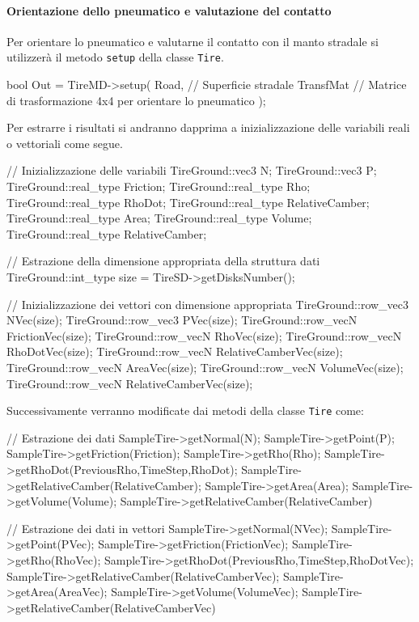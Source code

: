 \paragraph{Orientazione dello pneumatico e valutazione del contatto}
Per orientare lo pneumatico e valutarne il contatto con il manto stradale si utilizzerà il metodo \texttt{setup} della classe \texttt{Tire}.
\begin{pseudoc}
bool Out = TireMD->setup(
	Road,     // Superficie stradale
	TransfMat // Matrice di trasformazione 4x4 per orientare lo pneumatico
	);
\end{pseudoc}
Per estrarre i risultati si andranno dapprima a inizializzazione delle variabili reali o vettoriali come segue.
\begin{pseudoc}
	// Inizializzazione delle variabili
	TireGround::vec3 N;
	TireGround::vec3 P;
	TireGround::real_type Friction;
	TireGround::real_type Rho;
	TireGround::real_type RhoDot;
	TireGround::real_type RelativeCamber;
	TireGround::real_type Area;
	TireGround::real_type Volume;
	TireGround::real_type RelativeCamber;
	
	// Estrazione della dimensione appropriata della struttura dati
	TireGround::int_type size = TireSD->getDisksNumber();
	
	// Inizializzazione dei vettori con dimensione appropriata
	TireGround::row_vec3 NVec(size);
	TireGround::row_vec3 PVec(size);
	TireGround::row_vecN FrictionVec(size);
	TireGround::row_vecN RhoVec(size);
	TireGround::row_vecN RhoDotVec(size);
	TireGround::row_vecN RelativeCamberVec(size);
	TireGround::row_vecN AreaVec(size);
	TireGround::row_vecN VolumeVec(size);
	TireGround::row_vecN RelativeCamberVec(size);
\end{pseudoc}
Successivamente verranno modificate dai metodi della classe \texttt{Tire} come:
\begin{pseudoc}
	// Estrazione dei dati
	SampleTire->getNormal(N);
	SampleTire->getPoint(P);
	SampleTire->getFriction(Friction);
	SampleTire->getRho(Rho);
	SampleTire->getRhoDot(PreviousRho,TimeStep,RhoDot);
	SampleTire->getRelativeCamber(RelativeCamber);
	SampleTire->getArea(Area);
	SampleTire->getVolume(Volume);
	SampleTire->getRelativeCamber(RelativeCamber)
	
	// Estrazione dei dati in vettori
	SampleTire->getNormal(NVec);
	SampleTire->getPoint(PVec);
	SampleTire->getFriction(FrictionVec);
	SampleTire->getRho(RhoVec);
	SampleTire->getRhoDot(PreviousRho,TimeStep,RhoDotVec);
	SampleTire->getRelativeCamber(RelativeCamberVec);
	SampleTire->getArea(AreaVec);
	SampleTire->getVolume(VolumeVec);
	SampleTire->getRelativeCamber(RelativeCamberVec)
\end{pseudoc}
%
